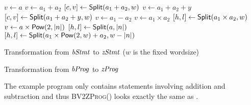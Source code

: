 \begin{algorithm}
  \begin{algorithmic}[1]
        \Return $v \leftarrow a$
      \EndCase
        \Return $v \leftarrow a_1 + a_2$
      \EndCase
        \Return ${[}{c}, {v}{]} \leftarrow \mbox{\textsf{Split}}(a_1 + a_2, w)$
      \EndCase
        \Return $v \leftarrow a_1 + a_2 + y$
      \EndCase
        \Return ${[}{c}, {v}{]} \leftarrow \mbox{\textsf{Split}}(a_1 + a_2 + y, w)$
      \EndCase
        \Return $v \leftarrow a_1 - a_2$
      \EndCase
        \Return $v \leftarrow a_1 \times a_2$
      \EndCase
        \Return ${[}{h}, {l}{]} \leftarrow \mbox{\textsf{Split}}(a_1 \times a_2, w)$
      \EndCase
        \Return $v \leftarrow a \times \mbox{\textsf{Pow}}(2, |n|)$
      \EndCase
        \Return ${[}{h}, {l}{]} \leftarrow \mbox{\textsf{Split}}(a, |n|)$
      \EndCase
        \Return ${[}{h}, {l}{]} \leftarrow \mbox{\textsf{Split}}(a_1 \times \mbox{\textsf{Pow}}(2, w) + a_2, w - |n|)$
      \EndCase
    \EndMatch
    \EndFunction
  \end{algorithmic}
  \caption{Transformation from $\mathit{bStmt}$ to $\mathit{zStmt}$ ($w$ is the fixed wordsize)}
  \label{algorithm:bv2z-stmt}
\end{algorithm}

\begin{algorithm}
  \begin{algorithmic}[1]
      \Case{$\epsilon$} \Return{$\epsilon$} \EndCase
        \EndCase
    \EndMatch
    \EndFunction
  \end{algorithmic}
  \caption{Transformation from $\mathit{bProg}$ to $\mathit{zProg}$}
  \label{algorithm:bv2z-prog}
\end{algorithm}

The example program  only contains statements involving addition and subtraction and thus \textsc{BV2ZProg}() looks exactly the same as .

